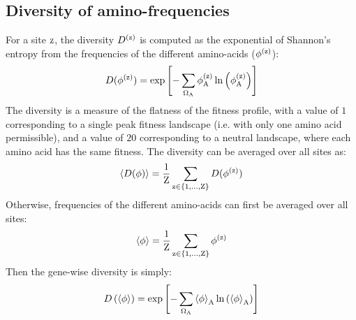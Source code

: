 \subsection{Diversity of amino-frequencies}
\label{subsec:entropy}

For a site $\text{z}$, the diversity $D^{(\text{z})}$ is computed as the exponential of Shannon's entropy from the frequencies of the different amino-acids ($\phi^{(\text{z})}$):
\begin{equation}
    D(\phi^{(\text{z})}) = \exp \left[ - \sum\limits_{\Omega_{\text{A}}} \phi^{(\text{z})}_{\text{A}} \ln \left( \phi^{(\text{z})}_{\text{A}} \right) \right]
    \label{eq:diversity-site-specific}
\end{equation}
The diversity is a measure of the flatness of the fitness profile, with a value of $1$ corresponding to a single peak fitness landscape (i.e. with only one amino acid permissible), and a value of $20$ corresponding to a neutral landscape, where each amino acid has the same fitness.
The diversity can be averaged over all sites as:
\begin{equation}
    \left\langle D(\phi) \right\rangle = \dfrac{1}{\text{Z}}\sum\limits_{\text{z} \in \{1, \hdots, \text{Z}\}} D(\phi^{(\text{z})})
    \label{eq:diversity-site-specific-avg}
\end{equation}
Otherwise, frequencies of the different amino-acids can first be averaged over all sites:
\begin{equation}
    \left\langle \phi \right\rangle = \dfrac{1}{\text{Z}}\sum\limits_{\text{z} \in \{1, \hdots, \text{Z}\}} \phi^{(\text{z})}
    \label{eq:profile-gene-wise}
\end{equation}
Then the gene-wise diversity is simply:
\begin{equation}
    D \left(  \left\langle \phi \right\rangle \right) = \exp \left[ - \sum\limits_{\Omega_{\text{A}}} \left\langle \phi \right\rangle_{\text{A}} \ln \left( \left\langle \phi \right\rangle_{\text{A}} \right) \right]
    \label{eq:diversity-gene-wise}
\end{equation}

